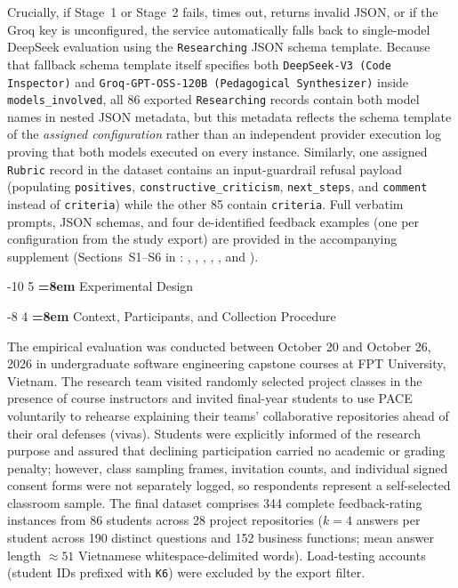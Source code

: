 \documentclass{llncs}
\makeatletter
\renewcommand\section{\@startsection{section}{1}{\z@}%
                       {-10\p@ \@plus -2\p@ \@minus -2\p@}%
                       {5\p@ \@plus 1\p@ \@minus 1\p@}%
                       {\normalfont\large\bfseries\boldmath
                        \rightskip=\z@ \@plus 8em\pretolerance=10000 }}
\renewcommand\subsection{\@startsection{subsection}{2}{\z@}%
                       {-8\p@ \@plus -2\p@ \@minus -2\p@}%
                       {4\p@ \@plus 1\p@ \@minus 1\p@}%
                       {\normalfont\normalsize\bfseries\boldmath
                        \rightskip=\z@ \@plus 8em\pretolerance=10000 }}
\makeatother
\begin{document}
Crucially, if Stage~1 or Stage~2 fails, times out, returns invalid JSON, or if the Groq key is unconfigured, the service automatically falls back to single-model DeepSeek evaluation using the \texttt{Researching} JSON schema template. Because that fallback schema template itself specifies both \texttt{DeepSeek-V3 (Code Inspector)} and \texttt{Groq-GPT-OSS-120B (Pedagogical Synthesizer)} inside \texttt{models\_\allowbreak involved}, all 86 exported \texttt{Researching} records contain both model names in nested JSON metadata, but this metadata reflects the schema template of the \emph{assigned configuration} rather than an independent provider execution log proving that both models executed on every instance. Similarly, one assigned \texttt{Rubric} record in the dataset contains an input-guardrail refusal payload (populating \texttt{positives}, \texttt{constructive\_criticism}, \texttt{next\_steps}, and \texttt{comment} instead of \texttt{criteria}) while the other 85 contain \texttt{criteria}. Full verbatim prompts, JSON schemas, and four de-identified feedback examples (one per configuration from the study export) are provided in the accompanying supplement (Sections~S1--S6 in : , , , , , and ).

\section{Experimental Design}
\label{sec:method}\label{sec:experiments}

\subsection{Context, Participants, and Collection Procedure}

The empirical evaluation was conducted between October 20 and October 26, 2026 in undergraduate software engineering capstone courses at FPT University, Vietnam. The research team visited randomly selected project classes in the presence of course instructors and invited final-year students to use PACE voluntarily to rehearse explaining their teams' collaborative repositories ahead of their oral defenses (vivas). Students were explicitly informed of the research purpose and assured that declining participation carried no academic or grading penalty; however, class sampling frames, invitation counts, and individual signed consent forms were not separately logged, so respondents represent a self-selected classroom sample. The final dataset comprises 344 complete feedback-rating instances from 86 students across 28 project repositories ($k = 4$ answers per student across 190 distinct questions and 152 business functions; mean answer length $\approx 51$ Vietnamese whitespace-delimited words). Load-testing accounts (student IDs prefixed with \texttt{K6}) were excluded by the export filter.
\end{document}
